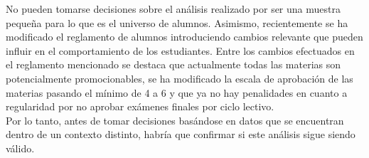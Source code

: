 No pueden tomarse decisiones sobre el análisis realizado por ser una muestra pequeña para lo que es el universo de alumnos. Asimismo, recientemente se ha modificado el reglamento de alumnos introduciendo cambios relevante que pueden influir en el comportamiento de los estudiantes. Entre los cambios efectuados en el reglamento mencionado se destaca que actualmente todas las materias son potencialmente promocionables, se ha modificado la escala de aprobación de las materias pasando el mínimo de 4 a 6 y que ya no hay penalidades en cuanto a regularidad por no aprobar exámenes finales por ciclo lectivo.\\
Por lo tanto, antes de tomar decisiones basándose en datos que se encuentran dentro de un contexto distinto, habría que confirmar si este análisis sigue siendo válido.

